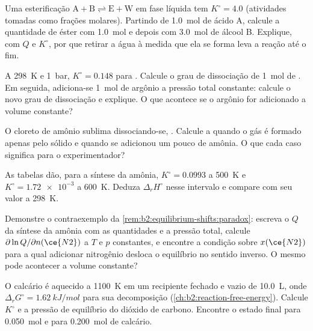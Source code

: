 \begin{exercise}[$\star\star$]\label{exo:b2:equilibrium-shifts:6}
Uma esterificação $\mathrm{A + B \rightleftharpoons E + W}$ em fase líquida
tem $K^\circ = 4.0$ (atividades tomadas como frações molares). Partindo de
\qty{1.0}{mol} de ácido A, calcule a quantidade de éster com \qty{1.0}{mol} e depois com
\qty{3.0}{mol} de álcool B. Explique, com $Q$ e $K^\circ$, por que retirar a
água à medida que ela se forma leva a reação até o fim.
\end{exercise}

\begin{exercise}[$\star\star$]\label{exo:b2:equilibrium-shifts:7}
A \qty{298}{K} e \qty{1}{bar}, $K^\circ = 0.148$ para .
Calcule o grau de dissociação de \qty{1}{mol} de . Em seguida,
adiciona-se \qty{1}{mol} de argônio a pressão total constante: calcule o novo
grau de dissociação e explique. O que acontece se o argônio for adicionado a
volume constante?
\end{exercise}

\begin{exercise}[$\star\star$]\label{exo:b2:equilibrium-shifts:8}
O cloreto de amônio sublima dissociando-se, . Calcule a  quando o gás é formado apenas pelo sólido e
quando se adicionou um pouco de amônia. O que cada caso significa para o
experimentador?
\end{exercise}

\begin{exercise}[$\star\star$]\label{exo:b2:equilibrium-shifts:9}
As tabelas dão, para a síntese da amônia, $K^\circ = 0.0993$ a \qty{500}{K} e
$K^\circ = \num{1.72e-3}$ a \qty{600}{K}. Deduza $\Delta_r H^\circ$ nesse
intervalo e compare com seu valor a \qty{298}{K}.
\end{exercise}

\begin{exercise}[$\star\star\star$]\label{exo:b2:equilibrium-shifts:10}
Demonstre o contraexemplo da \cref{rem:b2:equilibrium-shifts:paradox}: escreva
o $Q$ da síntese da amônia com as quantidades e a pressão total, calcule
$\partial\ln Q/\partial n(\ce{N2})$ a $T$ e $p$ constantes, e encontre a
condição sobre $x(\ce{N2})$ para a qual adicionar nitrogênio desloca o
equilíbrio no sentido inverso. O mesmo pode acontecer a volume constante?
\end{exercise}

\begin{exercise}[$\star\star\star$]\label{exo:b2:equilibrium-shifts:11}
O calcário é aquecido a \qty{1100}{K} em um recipiente fechado e vazio de
\qty{10.0}{L}, onde $\Delta_r G^\circ = \qty{1.62}{kJ/mol}$ para sua
decomposição (\cref{ch:b2:reaction-free-energy}). Calcule $K^\circ$ e a
pressão de equilíbrio do dióxido de carbono. Encontre o estado final para
\qty{0.050}{mol} e para \qty{0.200}{mol} de calcário.
\end{exercise}

